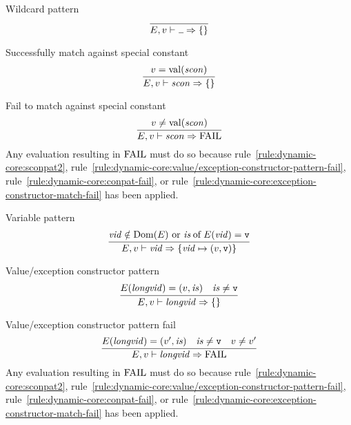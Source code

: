 \begin{inference-rule}{Wildcard pattern}
\begin{equation}\label{rule:dynamic-core:wildcard-pattern}
\vcenter{\infer{\E,\V\ts\wildpat\ra \emptymap}
  {}}
\end{equation}
\end{inference-rule}

\begin{inference-rule}{Successfully match against special constant}
\begin{equation}\label{rule:dynamic-core:sconpat1}
\vcenter{\infer{\E,\V\ts\scon\ra \emptymap}
  {\V=\sconval(\scon)}}
\end{equation}
\end{inference-rule}

\begin{inference-rule}{Fail to match against special constant}
\begin{equation}\label{rule:dynamic-core:sconpat2}
\vcenter{\infer{\E,\V\ts\scon\ra \FAIL}
  {\V\neq\sconval(\scon)}}
\end{equation}
Any evaluation resulting in ${\rm FAIL}$ must do so because 
rule~\ref{rule:dynamic-core:sconpat2},
rule~\ref{rule:dynamic-core:value/exception-constructor-pattern-fail},
rule~\ref{rule:dynamic-core:conpat-fail},
or rule~\ref{rule:dynamic-core:exception-constructor-match-fail}
has been applied.
\end{inference-rule}

\begin{inference-rule}{Variable pattern}
\begin{equation}\label{rule:dynamic-core:variable-pattern}
\vcenter{\infer{\E,\V\ts\vid\ra \{\vid\mapsto(\V,\isv)\} }
  {\hbox{$\vid\notin\Dom(\E)$ or $\of{\is}{\E(\vid)} = \isv$}}}
\end{equation}
\end{inference-rule}

\begin{inference-rule}{Value/exception constructor pattern}
\begin{equation}\label{rule:dynamic-core:value/exception-constructor-pattern}
\vcenter{\infer{\E,\V\ts\longvid\ra\emptymap}
  {\E(\longvid)=(\V,\is)
    & \is\neq\isv}}
\end{equation}
\end{inference-rule}

\begin{inference-rule}{Value/exception constructor pattern fail}
\begin{equation}\label{rule:dynamic-core:value/exception-constructor-pattern-fail}
\vcenter{\infer{\E,\V\ts\longvid\ra\FAIL}
  {\E(\longvid)=(\V',\is)
    &\is\neq\isv
    &\V\neq\V'}}
\end{equation}
Any evaluation resulting in ${\rm FAIL}$ must do so because 
rule~\ref{rule:dynamic-core:sconpat2},
rule~\ref{rule:dynamic-core:value/exception-constructor-pattern-fail},
rule~\ref{rule:dynamic-core:conpat-fail},
or rule~\ref{rule:dynamic-core:exception-constructor-match-fail}
has been applied.
\end{inference-rule}

